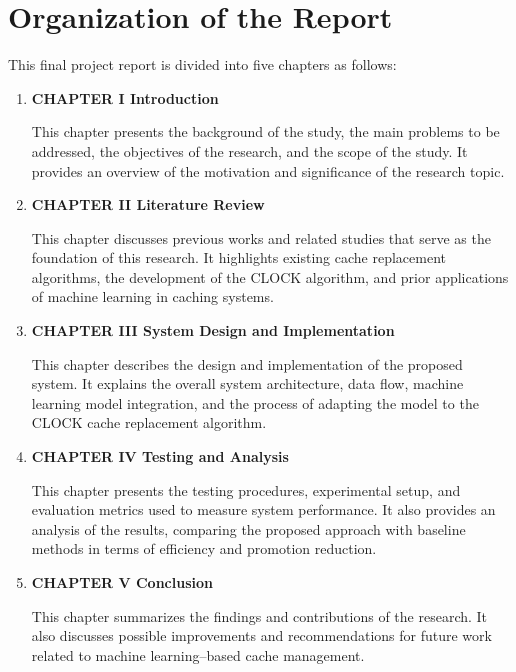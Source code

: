 \section{Organization of the Report}
\label{sec:sistematikapenulisan}

This final project report is divided into five chapters as follows:

\begin{enumerate}[nolistsep]

  \item \textbf{CHAPTER I Introduction}

    This chapter presents the background of the study, the main
    problems to be addressed, the objectives of the research, and the
    scope of the study. It provides an overview of the motivation and
    significance of the research topic.

    \vspace{2ex}

  \item \textbf{CHAPTER II Literature Review}

    This chapter discusses previous works and related studies that
    serve as the foundation of this research. It highlights existing
    cache replacement algorithms, the development of the CLOCK
    algorithm, and prior applications of machine learning in caching systems.

    \vspace{2ex}

  \item \textbf{CHAPTER III System Design and Implementation}

    This chapter describes the design and implementation of the
    proposed system. It explains the overall system architecture,
    data flow, machine learning model integration, and the process of
    adapting the model to the CLOCK cache replacement algorithm.

    \vspace{2ex}

  \item \textbf{CHAPTER IV Testing and Analysis}

    This chapter presents the testing procedures, experimental setup,
    and evaluation metrics used to measure system performance. It
    also provides an analysis of the results, comparing the proposed
    approach with baseline methods in terms of efficiency and
    promotion reduction.

    \vspace{2ex}

  \item \textbf{CHAPTER V Conclusion}

    This chapter summarizes the findings and contributions of the
    research. It also discusses possible improvements and
    recommendations for future work related to machine learning–based
    cache management.

\end{enumerate}
